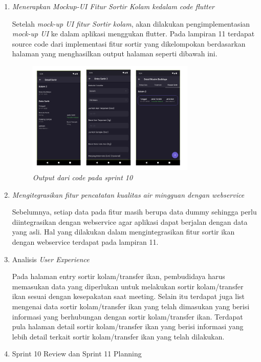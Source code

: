 \begin{enumerate}[listparindent=2em]
	\item{\textit{Menerapkan Mockup-UI Fitur Sortir Kolam kedalam code flutter}}
	
	Setelah \textit{mock-up UI fitur Sortir kolam}, akan dilakukan pengimplementasian \textit{mock-up UI} ke dalam aplikasi menggukan flutter. Pada lampiran 11 terdapat source code dari implementasi fitur sortir yang dikelompokan berdasarkan halaman yang menghasilkan output halaman seperti dibawah ini.

	\begin{figure}[H]
		\centering
		\includegraphics[keepaspectratio, width=8cm]{gambar/sssprint10}
		\caption{\textit{Output dari code pada sprint 10}}
		\label{gambar:sssprint10}
		\end{figure}

    \item{\textit{Mengitegrasikan fitur pencatatan kualitas air mingguan dengan webservice}}

	Sebelumnya, setiap data pada fitur masih berupa data dummy sehingga perlu diintegrasikan dengan webservice agar aplikasi dapat berjalan dengan data yang asli. Hal yang dilakukan dalam mengintegrasikan fitur sortir ikan dengan webservice terdapat pada lampiran 11.

  \item{Analisis \textit{User Experience}} 
 
  Pada halaman entry sortir kolam/transfer ikan, pembudidaya harus memasukan data yang diperlukan untuk melakukan sortir kolam/transfer ikan sesuai dengan kesepakatan saat meeting. Selain itu terdapat juga list mengenai data sortir kolam/transfer ikan yang telah dimasukan yang berisi informasi yang berhubungan dengan sortir kolam/transfer ikan. Terdapat pula halaman detail sortir kolam/transfer ikan yang berisi informasi yang lebih detail terkait sortir kolam/transfer ikan yang telah dilakukan.

\item{Sprint 10 Review dan Sprint 11 Planning}


\end{enumerate}
